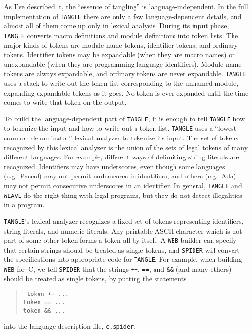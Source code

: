 As I've described it, the ``essence of tangling'' is
language-independent. 
In the full implementation of {\tt TANGLE} there are only a few
language-dependent details, and almost all of them come up only in
lexical analysis. 
During its input phase, {\tt TANGLE} converts macro definitions and
module definitions into token lists.
The major kinds of tokens are
module name tokens, identifier tokens, and ordinary tokens.
Identifier tokens may be expandable (when they are macro names) or
unexpandable (when they are programming-language identifiers).
Module name tokens are always expandable, and ordinary tokens are
never expandable.
{\tt TANGLE} uses a stack to write out the token list corresponding to
the unnamed module, expanding expandable tokens as it goes.
No token is ever expanded until the time comes to write that token on
the output.

To build the language-dependent part of {\tt TANGLE}, it is enough to
tell {\tt TANGLE} how to tokenize the input and how to write out a
token list.
{\tt TANGLE} uses a ``lowest common denominator'' lexical analyzer to
tokenize its input.
The set of tokens recognized by this lexical analyzer is the union of
the sets of legal tokens of many different languages.
For example, different ways of delimiting string literals are
recognized. 
Identifiers may have underscores, even though some languages
(e.g.~Pascal) may not permit underscores in identifiers, and others
(e.g.~Ada) may not permit consecutive underscores in an identifier.
In general, {\tt TANGLE} and {\tt WEAVE} do the right thing with legal
programs, but they do not detect illegalities in a program.

{\tt TANGLE}'s lexical analyzer recognizes a fixed set of tokens
representing identifiers, string literals, and numeric literals.
Any printable ASCII character which is not part of some other
token forms a token all by itself.
A {\tt WEB} builder can specify that certain strings should
be treated as single tokens, and
{\tt SPIDER} will convert the specifications into appropriate code for
{\tt TANGLE}.
For example, when building {\tt WEB} for~C, we tell {\tt SPIDER} 
that the strings {\tt ++}, {\tt ==}, and {\tt \&\&} (and many others)
should be treated as single tokens, by putting the statements
\begin{quote}\tt
token ++ ...\\
token == ...\\
token \&\&\ ...
\end{quote}
into the language description file, {\tt c.spider}.

